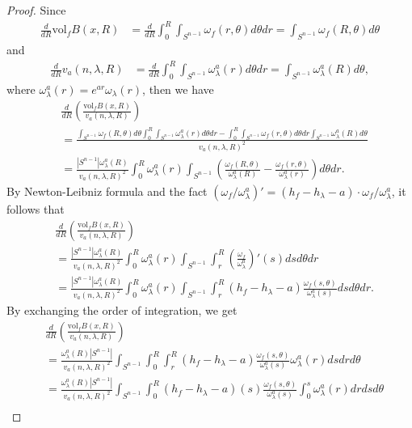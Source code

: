 \documentclass[11pt]{amsart}
\numberwithin{equation}{section}
\newcommand{\vol}{\mathrm{vol}}
\begin{document}
\begin{proof}
	Since
	 \begin{align*}
	 \frac{d}{dR}\vol_fB(x,R)&=\frac{d}{dR}\int_{0}^{R}\int_{S^{n-1}}\omega_f(r,\theta)d\theta dr=\int_{S^{n-1}}\omega_f(R,\theta)d\theta
	\end{align*}
	and
	\begin{align*}
	 \frac{d}{dR}v_a(n,\lambda,R)&=\frac{d}{dR}\int_{0}^{R}\int_{S^{n-1}}\omega_\lambda^a(r)d\theta dr=\int_{S^{n-1}}\omega_\lambda^a(R)d\theta,
	 \end{align*}
	 where $\omega_\lambda^a(r)=e^{ar}\omega_\lambda(r)$, then we have
	\begin{align*}
		&\frac{d}{dR}\left(\frac{\vol_fB(x,R)}{v_a(n,\lambda,R)}\right)\\
		&=\frac{\int_{S^{n-1}}\omega_f(R,\theta)d\theta\int_{0}^{R}\int_{S^{n-1}}\omega^a_\lambda(r)d\theta dr-\int_{0}^{R}\int_{S^{n-1}}\omega_f(r,\theta)d\theta dr \int_{S^{n-1}}\omega^a_\lambda(R)d\theta}{v_a(n,\lambda,R)^2}\\
		&=\frac{|S^{n-1}|\omega^a_\lambda(R)}{v_a(n,\lambda,R)^2}\int_{0}^{R}\omega^a_\lambda(r)\int_{S^{n-1}}\left(\frac{\omega_f(R,\theta)}{\omega^a_\lambda(R)}-\frac{\omega_f(r,\theta)}{\omega^a_\lambda(r)}\right)d\theta dr.
	\end{align*}
By Newton-Leibniz formula and the fact $(\omega_f/\omega^a_\lambda)'=(h_f-h_\lambda-a)\cdot\omega_f/\omega^a_\lambda$, it follows that
\begin{align*}
		&\frac{d}{dR}\left(\frac{\vol_fB(x,R)}{v_a(n,\lambda,R)}\right)\\
		&=\frac{|S^{n-1}|\omega^a_\lambda(R)}{v_a(n,\lambda,R)^2}\int_{0}^{R}\omega^a_\lambda(r)\int_{S^{n-1}}\int_{r}^{R}\left(\frac{\omega_f}{\omega^a_\lambda}\right)'(s)dsd\theta dr\\
		&=\frac{|S^{n-1}|\omega^a_\lambda(R)}{v_a(n,\lambda,R)^2}\int_{0}^{R}\omega^a_\lambda(r)\int_{S^{n-1}}\int_{r}^{R}(h_f-h_\lambda-a)\frac{\omega_f(s,\theta)}{\omega^a_\lambda(s)}dsd\theta dr.
\end{align*}
By exchanging the order of integration, we get
\begin{align*}
	&\frac{d}{dR}\left(\frac{\vol_fB(x,R)}{v_a(n,\lambda,R)}\right)\\
	&=\frac{\omega_\lambda^a(R)|S^{n-1}|}{v_a(n,\lambda,R)^2}\int_{S^{n-1}}\int_{0}^R\int_{r}^{R}(h_f-h_\lambda-a)\frac{\omega_f(s,\theta)}{\omega^a_\lambda(s)}\omega^a_\lambda(r)dsdrd\theta\\
	&=\frac{\omega_\lambda^a(R)|S^{n-1}|}{v_a(n,\lambda,R)^2}\int_{S^{n-1}}\int_{0}^R(h_f-h_\lambda-a)(s)\frac{\omega_f(s,\theta)}{\omega^a_\lambda(s)}\int_{0}^{s}\omega^a_\lambda(r)drdsd\theta\\

\end{align*}
\end{proof}
\end{document}
